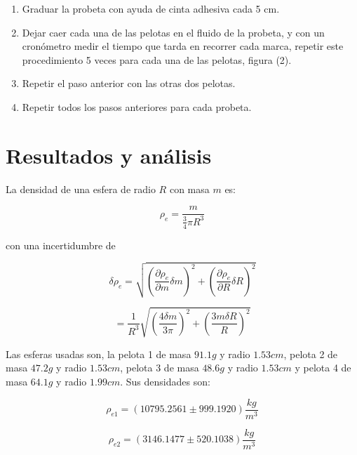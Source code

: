 \documentclass[DIV=calc, paper=a4, fontsize=11pt]{scrartcl}
\begin{document}
\begin{multicols}{2}
\begin{enumerate}
    \item Graduar la probeta con ayuda de cinta adhesiva cada 5 cm.
    
    \item Dejar caer cada una de las pelotas en el fluido de la probeta, y con un cronómetro medir el tiempo que tarda en recorrer cada marca, repetir este procedimiento 5 veces para cada una de las pelotas, figura (2).
    
    \item Repetir el paso anterior con las otras dos pelotas.
    
    \item Repetir todos los pasos anteriores para cada probeta.
\end{enumerate}



\section*{Resultados y análisis}

La densidad de una esfera de radio $R$ con masa $m$ es:

\begin{equation*}
    \rho_e = \frac{m}{\frac{3}{4}\pi R^3 }
\end{equation*}

con una incertidumbre de 

\begin{equation*}
    \delta \rho_e = \sqrt{\left(\frac{\partial \rho_e}{\partial m}\delta m\right)^{2}+ \left(\frac{\partial \rho_e}{\partial R}\delta 
    R\right)^2}
\end{equation*}

\begin{equation*}
    =\frac{1}{R^3}\sqrt{\left(\frac{4 \delta m}{3\pi}\right)^{2}+\left(\frac{3m\delta R}{R}\right)^{2}}
\end{equation*}

Las esferas usadas son, la pelota 1 de masa $91.1g$ y radio $1.53cm$, pelota 2 de masa $47.2g$ y radio $1.53cm$, pelota 3 de masa $48.6g$ y radio $1.53cm$ y pelota 4 de masa $64.1g$ y radio $1.99cm$. Sus densidades son:

\begin{equation*}
    \rho_{e1} = (10795.2561 \pm 999.1920) \frac{kg}{m^3}
\end{equation*}

\begin{equation*}
    \rho_{e2} = (3146.1477 \pm 520.1038) \frac{kg}{m^3}
\end{equation*}


\end{multicols}
\end{document}
